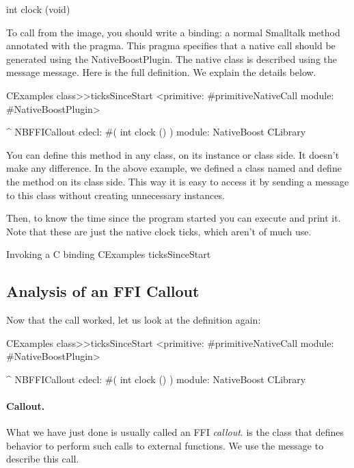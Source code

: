 \documentclass[a4paper,10pt,twoside]{book}
\begin{document}
\begin{code}{}
int clock (void)
\end{code}

To call  from the image, you should write a binding: a normal Smalltalk method annotated with the  pragma. This pragma specifies that a native call should be generated using the NativeBoostPlugin. The native class is described using the message  message. Here is the full definition. We  explain the details below.

\begin{code}{}
CExamples class>>ticksSinceStart
	<primitive: #primitiveNativeCall module: #NativeBoostPlugin>
	
	^ NBFFICallout cdecl: #( int clock () ) module: NativeBoost CLibrary
\end{code}



You can define this method in any class, on its instance or class side.
It doesn't make any difference. In the above example, we defined a class named  and define the method on its class side. This way it is easy to access it by sending a message to this class without creating unnecessary instances. 

Then, to know the time since the program started you can execute and print it.
Note that these are just the native clock ticks, which aren't of much use. 
\begin{script}{Invoking a C binding}
CExamples ticksSinceStart
\end{script}


\subsection{Analysis of an FFI Callout}
Now that the call worked, let us look at the definition again:

\begin{code}{}
CExamples class>>ticksSinceStart
	<primitive: #primitiveNativeCall module: #NativeBoostPlugin>
	
	^ NBFFICallout cdecl: #( int clock () ) module: NativeBoost CLibrary
\end{code}

\paragraph{Callout.}
What we have just done is usually called an FFI \emph{callout}.  is the class that defines behavior to perform such calls to external functions. We use the  message  to describe this call. 
\end{document}
